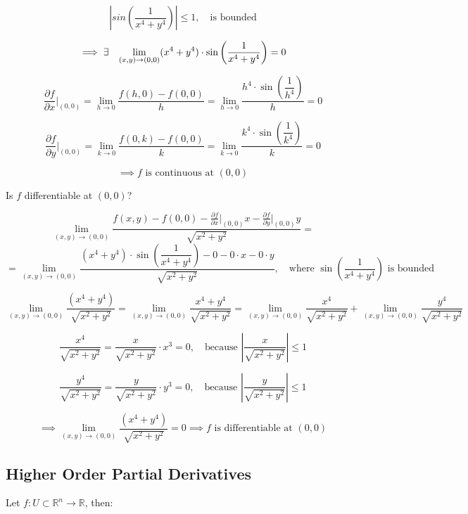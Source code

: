\documentclass[11pt]{article}
\begin{document}
\[
\left| sin \left( \dfrac{1}{x^4 + y^4} \right) \right| \leq 1, \quad \text{is bounded}
\]

\[
\implies \exists \hspace{0.3cm} \lim_{(x,y) \to (0,0)} (x^4 + y^4) \cdot \sin \left( \dfrac{1}{x^4 + y^4} \right) = 0
\]

\[
\frac{\partial f}{\partial x} \big|_{(0,0)} = \lim_{h \to 0} \frac{f(h,0) - f(0,0)}{h} = \lim_{h \to 0} \frac{h^4 \cdot \sin \left( \dfrac{1}{h^4} \right)}{h} = 0
\]

\[
\frac{\partial f}{\partial y} \big|_{(0,0)} = \lim_{k \to 0} \frac{f(0,k) - f(0,0)}{k} = \lim_{k \to 0} \frac{k^4 \cdot \sin \left( \dfrac{1}{k^4} \right)}{k} = 0
\]

\[
\implies f \text{ is continuous at } (0,0)
\]

Is $f$ differentiable at $(0,0)$?

\[
\lim_{(x,y) \to (0,0)} \frac{f(x,y) - f(0,0) - \frac{\partial f}{\partial x} \big|_{(0,0)} x - \frac{\partial f}{\partial y} \big|_{(0,0)} y}{\sqrt{x^2 + y^2}} = 
\]
\[
= \lim_{(x,y) \to (0,0)} \frac{(x^4 + y^4) \cdot \sin \left( \dfrac{1}{x^4 + y^4} \right) - 0 - 0 \cdot x - 0 \cdot y}{\sqrt{x^2 + y^2}}, \quad \text{where } \sin \left( \dfrac{1}{x^4 + y^4} \right) \text{ is bounded}
\]

\[
\lim_{(x,y) \to (0,0)} \frac{(x^4 + y^4)}{\sqrt{x^2 + y^2}} = \lim_{(x,y) \to (0,0)} \frac{x^4 + y^4}{\sqrt{x^2 + y^2}} = \lim_{(x,y) \to (0,0)} \frac{x^4}{\sqrt{x^2 + y^2}} + \lim_{(x,y) \to (0,0)} \frac{y^4}{\sqrt{x^2 + y^2}}
\]

\[
\frac{x^4}{\sqrt{x^2 + y^2}} = \frac{x}{\sqrt{x^2 + y^2}} \cdot x^3 = 0, \quad \text{because } \left| \frac{x}{\sqrt{x^2 + y^2}} \right| \leq 1
\]

\[
\frac{y^4}{\sqrt{x^2 + y^2}} = \frac{y}{\sqrt{x^2 + y^2}} \cdot y^3 = 0, \quad \text{because } \left| \frac{y}{\sqrt{x^2 + y^2}} \right| \leq 1
\]

\[
\implies \lim_{(x,y) \to (0,0)} \frac{(x^4 + y^4)}{\sqrt{x^2 + y^2}} = 0
\implies f \text{ is differentiable at } (0,0)
\]

\subsection{Higher Order Partial Derivatives}
Let $f : U \subset \mathbb{R}^n \rightarrow \mathbb{R}$, then:
\begin{center}
\end{center}
\end{document}
